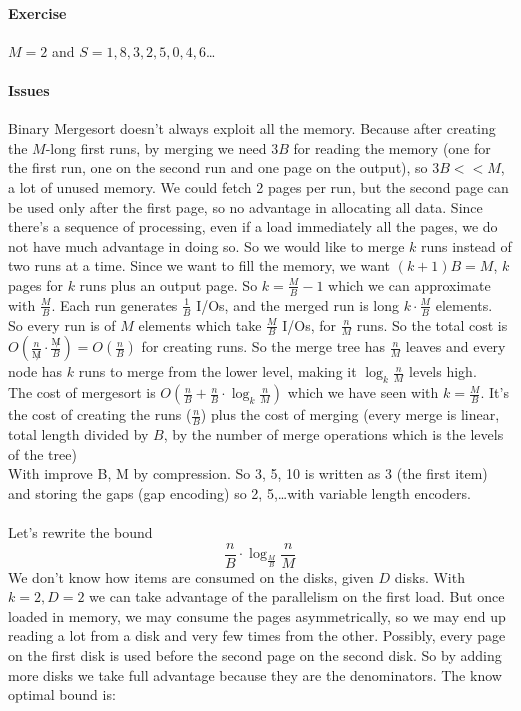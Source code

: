 \documentclass[10pt]{report}
\begin{document}
\paragraph{Exercise} $M = 2$ and $S = 1, 8, 3, 2, 5, 0, 4, 6$\ldots
\paragraph{Issues} Binary Mergesort doesn't always exploit all the memory. Because after creating the $M$-long first runs, by merging we need $3B$ for reading the memory (one for the first run, one on the second run and one page on the output), so $3B << M$, a lot of unused memory. We could fetch 2 pages per run, but the second page can be used only after the first page, so no advantage in allocating all data. Since there's a sequence of processing, even if a load immediately all the pages, we do not have much advantage in doing so. So we would like to merge $k$ runs instead of two runs at a time. Since we want to fill the memory, we want $(k+1)B = M$, $k$ pages for $k$ runs plus an output page. So $k = \frac{M}{B} - 1$ which we can approximate with $\frac{M}{B}$. Each run generates $\frac{1}{B}$ I/Os, and the merged run is long $k\cdot\frac{M}{B}$ elements.\\
So every run is of $M$ elements which take $\frac{M}{B}$ I/Os, for $\frac{n}{M}$ runs. So the total cost is $O(\frac{n}{\not M} \cdot \frac{\not M}{B}) = O(\frac{n}{B})$ for creating runs. So the merge tree has $\frac{n}{M}$ leaves and every node has $k$ runs to merge from the lower level, making it $\log_k \frac{n}{M}$ levels high.\\
The cost of mergesort is $O(\frac{n}{B} + \frac{n}{B}\cdot\log_k \frac{n}{M})$ which we have seen with $k = \frac{M}{B}$. It's the cost of creating the runs ($\frac{n}{B}$) plus the cost of merging (every merge is linear, total length divided by $B$, by the number of merge operations which is the levels of the tree)\\
With improve B, M by compression. So 3, 5, 10 is written as 3 (the first item) and storing the gaps (gap encoding) so 2, 5,\ldots with variable length encoders.\\\\
Let's rewrite the bound
$$\frac{n}{B}\cdot\log_{\frac{M}{B}}\frac{n}{M}$$
We don't know how items are consumed on the disks, given $D$ disks. With $k = 2, D = 2$ we can take advantage of the parallelism on the first load. But once loaded in memory, we may consume the pages asymmetrically, so we may end up reading a lot from a disk and very few times from the other. Possibly, every page on the first disk is used before the second page on the second disk. So by adding more disks we take full advantage because they are the denominators. The know optimal bound is:
\end{document}
